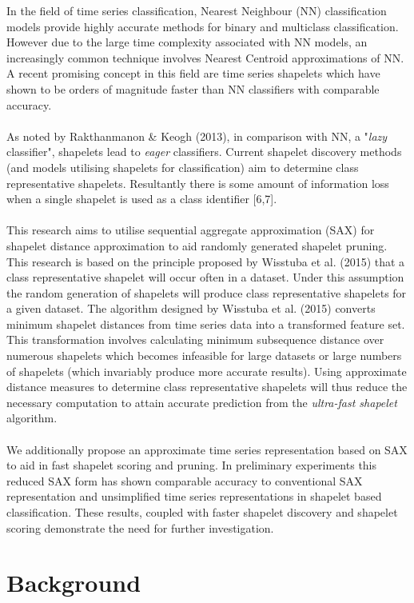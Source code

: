 \documentclass[10pt,a4paper]{article}
\begin{document}
In the field of time series classification, Nearest Neighbour (NN)
classification models provide highly accurate methods for binary and multiclass classification.
However due to the large time complexity associated with NN models, an increasingly common technique involves Nearest Centroid approximations of NN.
A recent promising concept in this field are time series shapelets which have shown to be orders of magnitude faster than NN classifiers with comparable accuracy.
\\\\
As noted by Rakthanmanon \& Keogh (2013), in comparison with NN, a "\textit{lazy} classifier", shapelets lead to \textit{eager} classifiers. 
Current shapelet discovery methods (and models utilising shapelets for classification) aim to determine class representative shapelets.
Resultantly there is some amount of information loss when a single shapelet is used as a class identifier [6,7].
\\\\
This research aims to utilise sequential aggregate approximation (SAX) for shapelet distance approximation to aid randomly generated shapelet pruning. 
This research is based on the principle proposed by Wisstuba et al. (2015) that a class representative shapelet will occur often in a dataset.
Under this assumption the random generation of shapelets will produce class representative shapelets for a given dataset.
The algorithm designed by Wisstuba et al. (2015) converts minimum shapelet distances from time series data into a transformed feature set. 
This transformation involves calculating minimum subsequence distance over numerous shapelets which becomes infeasible for large datasets or large numbers of shapelets (which invariably produce more accurate results).
Using approximate distance measures to determine class representative shapelets will thus reduce the necessary computation to attain accurate prediction from the \textit{ultra-fast shapelet} algorithm.
\\\\
We additionally propose an approximate time series representation based on SAX to aid in fast shapelet scoring and pruning.
In preliminary experiments this reduced SAX form has shown comparable accuracy to conventional SAX representation and unsimplified time series representations in shapelet based classification.
These results, coupled with faster shapelet discovery and shapelet scoring demonstrate the need for further investigation.

\section{Background}
\end{document}
